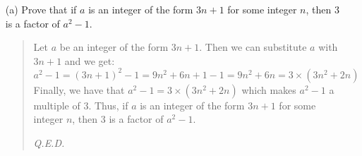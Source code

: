 \documentclass[12pt, a4paper]{article}                      %
\begin{document}
\begin{enumerate}
\begin{itemize}
\item[(a)]
Prove that if $a$ is an integer of the form $3n + 1$ for some integer $n$, then 3 is a factor
of $a^2 - 1$.
\begin{quote}
Let $a$ be an integer of the form $3n + 1$. Then we can substitute $a$ with $3n + 1$ and we get:
$$
a^2 - 1 = (3n + 1)^2 - 1 = 9n^2 + 6n + 1 - 1 = 9n^2 + 6n = 3 \times (3n^2 + 2n)
$$
Finally, we have that $a^2 - 1 = 3 \times (3n^2 + 2n)$ which makes $a^2 - 1$ a multiple of 3.
Thus, if $a$ is an integer of the form $3n + 1$ for some integer $n$, then 3 is a factor
of $a^2 - 1$.
\begin{flushright}
\textit{Q.E.D.}
\end{flushright}
\end{quote}
\end{itemize}
\end{enumerate}
\end{document}
